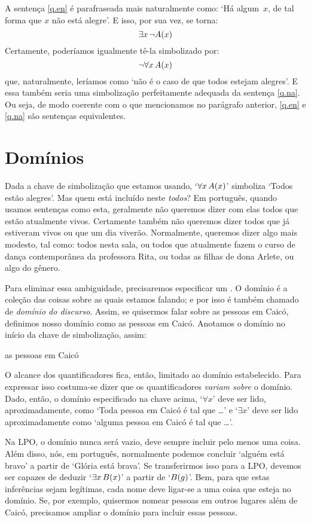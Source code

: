 A sentença \ref{q.en} é parafraseada mais naturalmente como:
`Há algum~$x$, de tal forma que $x$ não está alegre'.
E isso, por sua vez, se torna:
$$\exists x\, \neg \mathord{A}(x)$$
Certamente, poderíamos igualmente tê-la simbolizado por:
$$\neg\forall x\,\mathord{A}(x)$$
que, naturalmente, leríamos como `não é o caso de que todos estejam alegres'.
E essa também seria uma simbolização perfeitamente adequada da sentença \ref{q.na}.
Ou seja, de modo coerente com o que mencionamos no parágrafo anterior, \ref{q.en} e \ref{q.na} são sentenças equivalentes.


\section{Domínios}
Dada a chave de simbolização que estamos usando, `$\forall x\,\mathord{A}(x)$' simboliza `Todos estão alegres'.
Mas quem está incluído neste \emph{todos}?
Em português, quando usamos sentenças como esta, geralmente não queremos dizer com elas todos que estão atualmente vivos.
Certamente também não queremos dizer todos que já estiveram vivos ou que um dia viverão.
Normalmente, queremos dizer algo mais modesto, tal como:
todos nesta sala, ou todos que atualmente fazem o curso de dança contemporânea da professora Rita, ou todas as filhas de dona Arlete, ou algo do gênero.

Para eliminar essa ambiguidade, precisaremos especificar um .
O domínio é a coleção das coisas sobre as quais estamos falando; e por isso é também chamado de \emph{domínio do discurso}.
Assim, se quisermos falar sobre as pessoas em Caicó, definimos nosso domínio como as pessoas em Caicó.
Anotamos o domínio no início da chave de simbolização, assim:
\begin{center}
	\begin{ekey}
		\item[\text{domínio}] as pessoas em Caicó
	\end{ekey}
\end{center}
O alcance dos quantificadores fica, então, limitado ao domínio estabelecido.
Para expressar isso costuma-se dizer que os quantificadores \emph{variam sobre} o domínio.
Dado, então, o domínio especificado na chave acima, `$\forall x$' deve ser lido, aproximadamente, como  `Toda pessoa em Caicó é tal que \ldots' e `$\exists x $' deve ser lido aproximadamente como `alguma pessoa em Caicó é tal que \ldots'. 

Na LPO, o domínio nunca será vazio, deve sempre incluir pelo menos uma coisa. Além disso, nós, em português, normalmente podemos concluir `alguém está bravo' a partir de `Glória está brava'.
Se transferirmos isso para a LPO, devemos ser capazes de deduzir `$\exists x\, \mathord{B}(x)$' a partir de `$\mathord{B}(g)$'.
Bem, para que estas inferências sejam legítimas, cada nome deve ligar-se a uma coisa que esteja no domínio.
Se, por exemplo, quisermos nomear pessoas em outros lugares além de Caicó, precisamos ampliar o domínio para incluir essas pessoas. 

